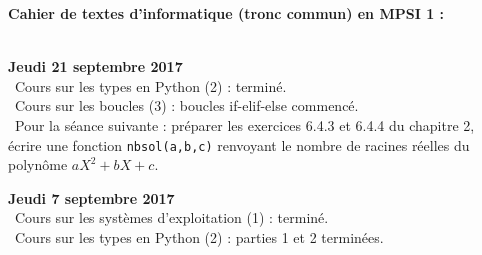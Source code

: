 \documentclass[12pt,a4paper]{article}
\begin{document}
\begin{center}
\Large\bf Cahier de textes d'informatique (tronc commun) en MPSI 1 :
\end{center}
\vspace{1cm}
\vspace{.4cm}\\

\noindent\textbf{Jeudi 21 septembre 2017}\\
\bu\ Cours sur les types en Python (2) : terminé. \\
\bu\ Cours sur les boucles (3) : boucles if-elif-else commencé. \\
\bu\ Pour la séance suivante : préparer les exercices 6.4.3 et 6.4.4 du chapitre 2, écrire une fonction \texttt{nbsol(a,b,c)} renvoyant le nombre de racines réelles du polynôme $aX^2+bX+c$.\\
\vspace{.4cm}

\noindent\textbf{Jeudi 7 septembre 2017}\\
\bu\ Cours sur les systèmes d'exploitation (1) : terminé.  \\
\bu\ Cours sur les types en Python (2) : parties 1 et 2 terminées. \\
\vspace{.4cm}

\label{end}
\end{document}
